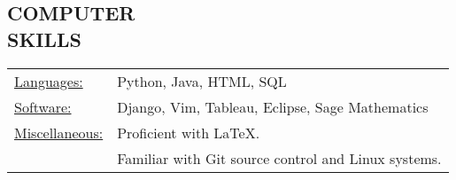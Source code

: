 \documentclass[line,margin]{res}
\begin{document}
\begin{resume}
\vspace*{.2cm} 

\section{COMPUTER \\ SKILLS}

\begin{tabular}{l l}
   \underline{Languages:} & Python, Java, HTML, SQL\\
   \underline{Software:} & Django, Vim, Tableau, Eclipse, Sage Mathematics\\
   \underline{Miscellaneous:} & Proficient with LaTeX. \\
                              &  Familiar with Git source control and Linux systems.
  \end{tabular}


\end{resume}
\end{document}

